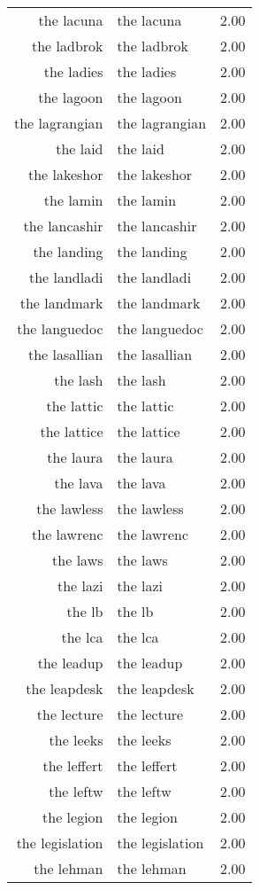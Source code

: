 \begin{table}[ht]
\begin{tabular}{rlr}
  the lacuna & the lacuna & 2.00 \\ 
  the ladbrok & the ladbrok & 2.00 \\ 
  the ladies & the ladies & 2.00 \\ 
  the lagoon & the lagoon & 2.00 \\ 
  the lagrangian & the lagrangian & 2.00 \\ 
  the laid & the laid & 2.00 \\ 
  the lakeshor & the lakeshor & 2.00 \\ 
  the lamin & the lamin & 2.00 \\ 
  the lancashir & the lancashir & 2.00 \\ 
  the landing & the landing & 2.00 \\ 
  the landladi & the landladi & 2.00 \\ 
  the landmark & the landmark & 2.00 \\ 
  the languedoc & the languedoc & 2.00 \\ 
  the lasallian & the lasallian & 2.00 \\ 
  the lash & the lash & 2.00 \\ 
  the lattic & the lattic & 2.00 \\ 
  the lattice & the lattice & 2.00 \\ 
  the laura & the laura & 2.00 \\ 
  the lava & the lava & 2.00 \\ 
  the lawless & the lawless & 2.00 \\ 
  the lawrenc & the lawrenc & 2.00 \\ 
  the laws & the laws & 2.00 \\ 
  the lazi & the lazi & 2.00 \\ 
  the lb & the lb & 2.00 \\ 
  the lca & the lca & 2.00 \\ 
  the leadup & the leadup & 2.00 \\ 
  the leapdesk & the leapdesk & 2.00 \\ 
  the lecture & the lecture & 2.00 \\ 
  the leeks & the leeks & 2.00 \\ 
  the leffert & the leffert & 2.00 \\ 
  the leftw & the leftw & 2.00 \\ 
  the legion & the legion & 2.00 \\ 
  the legislation & the legislation & 2.00 \\ 
  the lehman & the lehman & 2.00 \\ 

\end{tabular}
\end{table}
